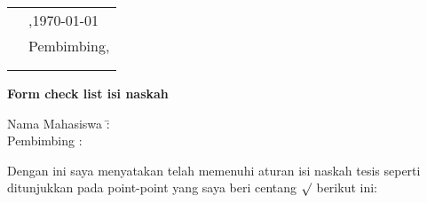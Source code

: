 \vspace{1cm}
\noindent
\begin{tabular}{p{7cm}p{7cm}}
	& \@city,\space\today \\
	& Pembimbing, \\ [1.5cm]
	& \underline{\@firstsupervisor} \\
	& \@firstsupervisornip
\end{tabular}

\newpage
\begin{center}
{\normalfont\large\bfseries\expandafter{Form check list isi naskah}}
\par\nobreak
\end{center}

\normalsize
\begin{tabbing}
	Nama Mahasiswa \= : \@fullname \\
	Pembimbing \> : \@firstsupervisor
\end{tabbing}

\noindent
Dengan ini saya menyatakan telah memenuhi aturan isi naskah tesis seperti ditunjukkan pada point-point yang saya beri centang $\surd$ berikut ini:

